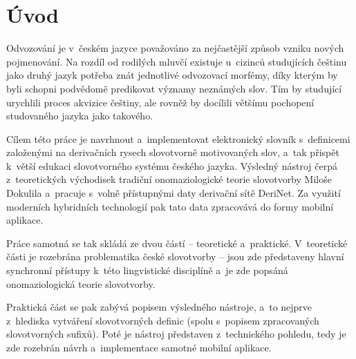 \hypertarget{uxfavod}{%
\chapter*{Úvod}\label{uvod}
}

Odvozování je v~českém jazyce považováno za nejčastější způsob vzniku
nových pojmenování. Na rozdíl od rodilých mluvčí existuje u~cizinců
studujících češtinu jako druhý jazyk potřeba znát jednotlivé odvozovací
morfémy, díky kterým by byli schopni podvědomě predikovat významy
neznámých slov. Tím by studující urychlili proces akvizice češtiny, ale
rovněž by docílili většímu pochopení studovaného jazyka jako takového.

Cílem této práce je navrhnout a~implementovat elektronický slovník
s~definicemi založenými na derivačních rysech slovotvorně motivovaných
slov, a~tak přispět k~větší edukaci slovotvorného systému českého
jazyka. Výsledný nástroj čerpá z~teoretických východisek tradiční
onomaziologické teorie slovotvorby Miloše Dokulila a~pracuje s~volně
přístupnými daty derivační sítě DeriNet. Za využití moderních hybridních
technologií pak tato data zpracovává do formy mobilní aplikace.

Práce samotná se tak skládá ze dvou částí -- teoretické a~praktické.
V~teoretické části je rozebrána problematika české slovotvorby -- jsou zde
představeny hlavní synchronní přístupy k~této lingvistické disciplíně
a~je zde popsáná onomaziologická teorie slovotvorby.

Praktická část se pak zabývá popisem výsledného nástroje, a~to nejprve
z~hlediska vytváření slovotvorných definic (spolu s~popisem zpracovaných
slovotvorných sufixů). Poté je nástroj představen z~technického pohledu,
tedy je zde rozebrán návrh a~implementace samotné mobilní aplikace.
